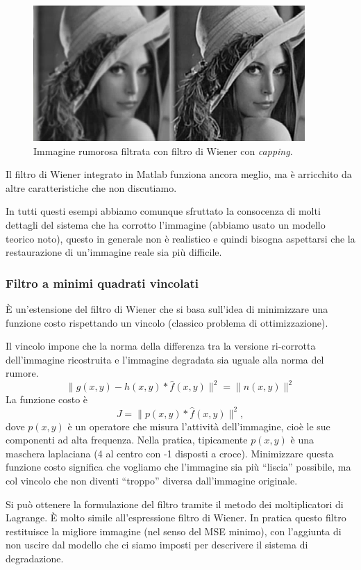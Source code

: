\documentclass[a4paper,11pt]{article}
\begin{document}
\renewcommand{\thefigure}{8.15}
\begin{figure}[!h]
  \centering
    \includegraphics[scale=0.5]{images/8/lena_wiener_capped.png}
    \caption{Immagine rumorosa filtrata con filtro di Wiener con \textit{capping}.}
\end{figure}

Il filtro di Wiener integrato in Matlab funziona ancora meglio, ma è arricchito da altre caratteristiche che non discutiamo.
\par
In tutti questi esempi abbiamo comunque sfruttato la consocenza di molti dettagli del sistema che ha corrotto l'immagine (abbiamo
usato un modello teorico noto), questo in generale non è realistico e quindi bisogna aspettarsi che la restaurazione di un'immagine reale
sia più difficile.

\subsubsection{Filtro a minimi quadrati vincolati}
È un'estensione del filtro di Wiener che si basa sull'idea di minimizzare una funzione costo rispettando un vincolo (classico problema di ottimizzazione).
\par
Il vincolo impone che la norma della differenza tra la versione ri-corrotta dell'immagine ricostruita e l'immagine degradata sia
uguale alla norma del rumore.
\[
\lVert g(x,y) - h(x,y)\ast \hat{f}(x,y) \rVert^2 = \lVert n(x,y) \rVert^2
\]
La funzione costo è
\[
J = \lVert p(x,y) \ast \hat{f}(x,y) \rVert^2,
\]
dove $p(x,y)$ è un operatore che misura l'attività dell'immagine, cioè le sue componenti ad alta frequenza. Nella pratica, tipicamente $p(x,y)$ è
una maschera laplaciana (4 al centro con -1 disposti a croce). Minimizzare questa funzione costo significa che vogliamo che l'immagine
sia più ``liscia'' possibile, ma col vincolo che non diventi ``troppo'' diversa dall'immagine originale.
\par
Si può ottenere la formulazione del filtro tramite il metodo dei moltiplicatori di Lagrange. È molto simile all'espressione filtro di Wiener.
In pratica questo filtro restituisce la migliore immagine (nel senso del MSE minimo), con l'aggiunta di non uscire dal modello che ci siamo
imposti per descrivere il sistema di degradazione.
\end{document}
